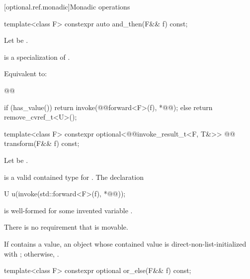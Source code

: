 [optional.ref.monadic]{Monadic operations}

%
\begin{itemdecl}
template<class F>
  constexpr auto and_then(F&& f) const;
\end{itemdecl}

\begin{itemdescr}
\pnum
Let  be .

\pnum
\mandates
{} is a specialization of .

\pnum
\effects
Equivalent to:
\begin{codeblock}
@@

if (has_value()) {
  return invoke(@@forward<F>(f), *@@);
} else {
  return remove_cvref_t<U>();
}
\end{codeblock}
\end{itemdescr}

%
\begin{itemdecl}
template<class F>
  constexpr optional<@@invoke_result_t<F, T&>> @\removed{>}@ transform(F&& f) const;
\end{itemdecl}

\begin{itemdescr}
\pnum
Let  be .

\pnum
\mandates
{} is a valid contained type for . The declaration
\begin{codeblock}
U u(invoke(std::forward<F>(f), *@@));
\end{codeblock}
is well-formed for some invented variable .
\begin{note}
There is no requirement that  is movable.
\end{note}

\pnum
\returns
If  contains a value, an  object whose contained value is direct-non-list-initialized with ; otherwise, .
\end{itemdescr}

%
\begin{itemdecl}
template<class F>
  constexpr optional or_else(F&& f) const;
\end{itemdecl}

